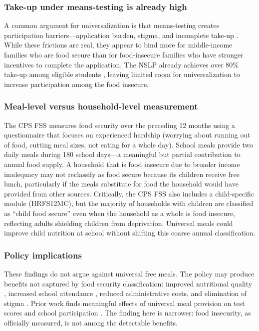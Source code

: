 \documentclass[12pt]{article}
\begin{document}
\subsubsection*{Take-up under means-testing is already high} A common argument for universalization is that means-testing creates participation barriers---application burden, stigma, and incomplete take-up \citep{moffitt1983stigma, deshpande2019snap, finkelstein2019take}. While these frictions are real, they appear to bind more for middle-income families who are food secure than for food-insecure families who have stronger incentives to complete the application. The NSLP already achieves over 80\% take-up among eligible students \citep{schwartz2020cost}, leaving limited room for universalization to increase participation among the food insecure.

\subsubsection*{Meal-level versus household-level measurement} The CPS FSS measures food security over the preceding 12 months using a questionnaire that focuses on experienced hardship (worrying about running out of food, cutting meal sizes, not eating for a whole day). School meals provide two daily meals during 180 school days---a meaningful but partial contribution to annual food supply. A household that is food insecure due to broader income inadequacy may not reclassify as food secure because its children receive free lunch, particularly if the meals substitute for food the household would have provided from other sources. Critically, the CPS FSS also includes a child-specific module (HRFS12MC), but the majority of households with children are classified as ``child food secure'' even when the household as a whole is food insecure, reflecting adults shielding children from deprivation. Universal meals could improve child nutrition at school without shifting this coarse annual classification.

\subsubsection*{Policy implications} These findings do not argue against universal free meals. The policy may produce benefits not captured by food security classification: improved nutritional quality \citep{schanzenbach2009does, bhatt2014breakfast}, increased school attendance \citep{figlio2018universal}, reduced administrative costs, and elimination of stigma \citep{moffitt1983stigma}. Prior work finds meaningful effects of universal meal provision on test scores \citep{figlio2018universal} and school participation \citep{gordon2007school}. The finding here is narrower: food insecurity, as officially measured, is not among the detectable benefits.
\end{document}
